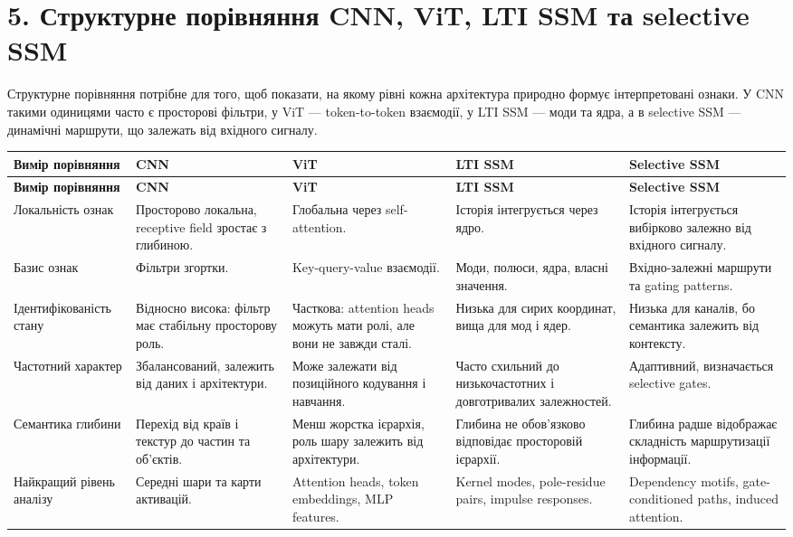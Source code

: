 \documentclass[12pt,a4paper]{article}
\begin{document}
\section*{5. Структурне порівняння CNN, ViT, LTI SSM та selective SSM}

Структурне порівняння потрібне для того, щоб показати, на якому
рівні кожна архітектура природно формує інтерпретовані ознаки.
У CNN такими одиницями часто є просторові фільтри, у ViT —
token-to-token взаємодії, у LTI SSM — моди та ядра, а в selective SSM —
динамічні маршрути, що залежать від вхідного сигналу.

\begin{longtable}{p{3cm} p{3.2cm} p{3.2cm} p{3.2cm} p{3.2cm}}
\toprule
\textbf{Вимір порівняння}
&
\textbf{CNN}
&
\textbf{ViT}
&
\textbf{LTI SSM}
&
\textbf{Selective SSM}
\\
\midrule
\endfirsthead

\toprule
\textbf{Вимір порівняння}
&
\textbf{CNN}
&
\textbf{ViT}
&
\textbf{LTI SSM}
&
\textbf{Selective SSM}
\\
\midrule
\endhead

Локальність ознак
&
Просторово локальна, receptive field зростає з глибиною.
&
Глобальна через self-attention.
&
Історія інтегрується через ядро.
&
Історія інтегрується вибірково залежно від вхідного сигналу.
\\

Базис ознак
&
Фільтри згортки.
&
Key-query-value взаємодії.
&
Моди, полюси, ядра, власні значення.
&
Вхідно-залежні маршрути та gating patterns.
\\

Ідентифікованість стану
&
Відносно висока: фільтр має стабільну просторову роль.
&
Часткова: attention heads можуть мати ролі, але вони не завжди сталі.
&
Низька для сирих координат, вища для мод і ядер.
&
Низька для каналів, бо семантика залежить від контексту.
\\

Частотний характер
&
Збалансований, залежить від даних і архітектури.
&
Може залежати від позиційного кодування і навчання.
&
Часто схильний до низькочастотних і довготривалих залежностей.
&
Адаптивний, визначається selective gates.
\\

Семантика глибини
&
Перехід від країв і текстур до частин та об'єктів.
&
Менш жорстка ієрархія, роль шару залежить від архітектури.
&
Глибина не обов'язково відповідає просторовій ієрархії.
&
Глибина радше відображає складність маршрутизації інформації.
\\

Найкращий рівень аналізу
&
Середні шари та карти активацій.
&
Attention heads, token embeddings, MLP features.
&
Kernel modes, pole-residue pairs, impulse responses.
&
Dependency motifs, gate-conditioned paths, induced attention.
\\
\bottomrule
\end{longtable}
\end{document}
